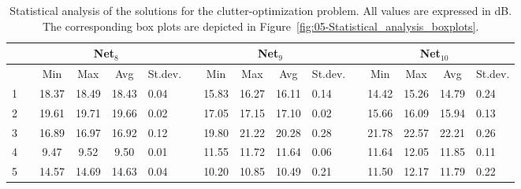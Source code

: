 \begin{table}
\centering

\caption{Statistical analysis of the solutions for the clutter-optimization
problem. All values are expressed in dB. The corresponding box plots
are depicted in Figure~\ref{fig:05-Statistical_analysis_boxplots}.
\label{tab:05-Statistical_analysis_of_solutions}}


{\scriptsize{}}%
\begin{tabular}{>{\centering}p{0.2cm}cccc>{\centering}p{0.75cm}cccc>{\centering}p{0.75cm}cccc>{\centering}p{0.75cm}}
\cline{3-16} 
 &  &  & \multicolumn{2}{c}{{\scriptsize{Net$_{8}$}}} &  &  &  & \multicolumn{2}{c}{{\scriptsize{Net$_{9}$}}} &  &  &  & \multicolumn{2}{c}{{\scriptsize{Net$_{10}$}}} & \tabularnewline
\hline 
{\scriptsize{Cat.}} &  & {\scriptsize{Min}} & {\scriptsize{Max}} & {\scriptsize{Avg}} & {\scriptsize{St.dev.}} &  & {\scriptsize{Min}} & {\scriptsize{Max}} & {\scriptsize{Avg}} & {\scriptsize{St.dev.}} &  & {\scriptsize{Min}} & {\scriptsize{Max}} & {\scriptsize{Avg}} & {\scriptsize{St.dev.}}\tabularnewline
\hline 
{\scriptsize{1}} &  & {\scriptsize{18.37}} & {\scriptsize{18.49}} & {\scriptsize{18.43}} & {\scriptsize{0.04}} &  & {\scriptsize{15.83}} & {\scriptsize{16.27}} & {\scriptsize{16.11}} & {\scriptsize{0.14}} &  & {\scriptsize{14.42}} & {\scriptsize{15.26}} & {\scriptsize{14.79}} & {\scriptsize{0.24}}\tabularnewline
\cline{1-6} \cline{8-11} \cline{13-16} 
{\scriptsize{2}} &  & {\scriptsize{19.61}} & {\scriptsize{19.71}} & {\scriptsize{19.66}} & {\scriptsize{0.02}} &  & {\scriptsize{17.05}} & {\scriptsize{17.15}} & {\scriptsize{17.10}} & {\scriptsize{0.02}} &  & {\scriptsize{15.66}} & {\scriptsize{16.09}} & {\scriptsize{15.94}} & {\scriptsize{0.13}}\tabularnewline
\cline{1-6} \cline{8-11} \cline{13-16} 
{\scriptsize{3}} &  & {\scriptsize{16.89}} & {\scriptsize{16.97}} & {\scriptsize{16.92}} & {\scriptsize{0.12}} &  & {\scriptsize{19.80}} & {\scriptsize{21.22}} & {\scriptsize{20.28}} & {\scriptsize{0.28}} &  & {\scriptsize{21.78}} & {\scriptsize{22.57}} & {\scriptsize{22.21}} & {\scriptsize{0.26}}\tabularnewline
\cline{1-6} \cline{8-11} \cline{13-16} 
{\scriptsize{4}} &  & {\scriptsize{9.47}} & {\scriptsize{9.52}} & {\scriptsize{9.50}} & {\scriptsize{0.01}} &  & {\scriptsize{11.55}} & {\scriptsize{11.72}} & {\scriptsize{11.64}} & {\scriptsize{0.06}} &  & {\scriptsize{11.64}} & {\scriptsize{12.05}} & {\scriptsize{11.85}} & {\scriptsize{0.11}}\tabularnewline
\cline{1-6} \cline{8-11} \cline{13-16} 
{\scriptsize{5}} &  & {\scriptsize{14.57}} & {\scriptsize{14.69}} & {\scriptsize{14.63}} & {\scriptsize{0.04}} &  & {\scriptsize{10.20}} & {\scriptsize{10.85}} & {\scriptsize{10.49}} & {\scriptsize{0.21}} &  & {\scriptsize{11.50}} & {\scriptsize{12.17}} & {\scriptsize{11.79}} & {\scriptsize{0.22}}\tabularnewline

\end{tabular}
\end{table}
